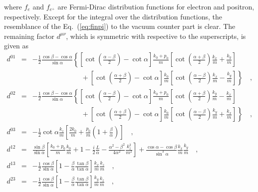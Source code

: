 where $f_{e}$ and $f_{e^{+}}$ are Fermi-Dirac distribution functions for
electron
and positron, respectively.
Except for the integral over the distribution functions, the resemblance of
the
Eq.~(\ref{eq:finpi}) to the vacuum counter part is clear. The remaining
factor
$d^{\mu \nu}$, which is symmetric with respective to the superscripts, is
given as
\begin{eqnarray}
d^{01} & = & -\frac{1}{2} \frac{\cos \beta - \cos \alpha}{\sin \alpha}
\left \{ \left [ \cot \left (\frac{\alpha - \beta}{2} \right ) - \cot \alpha
\right ]
\frac{k_{0} + p_{0}}{m} \left [ \cot \left (\frac{\alpha + \beta}{2}
\right )
\frac{k_{x}}{m} + \frac{k_{y}}{m} \right ]\right . \nonumber \\
&& \qquad \qquad \qquad \quad +  \left . \left [
\cot \left (\frac{\alpha + \beta}{2} \right ) - \cot \alpha \right ]
\frac{k_{0}}{m} \left [\cot \left (
\frac{\alpha - \beta}{2} \right ) \frac{k_{x}}{m} - \frac{k_{y}}{m} \right ]
\right \} \quad , \\
d^{02} & = & -\frac{1}{2} \frac{\cos \beta - \cos \alpha}{\sin \alpha}
\left \{ \left [ \cot \left (\frac{\alpha - \beta}{2} \right ) - \cot \alpha
\right ]
\frac{k_{0} + p_{0}}{m} \left [ \cot \left (\frac{\alpha + \beta}{2}
\right )
\frac{k_{y}}{m} - \frac{k_{x}}{m} \right ]\right . \nonumber \\
&& \qquad \qquad \qquad \quad +  \left . \left [
\cot \left (\frac{\alpha + \beta}{2} \right ) - \cot \alpha \right ]
\frac{k_{0}}{m} \left [\cot \left (
\frac{\alpha - \beta}{2} \right ) \frac{k_{y}}{m} + \frac{k_{x}}{m} \right ]
\right \} \quad , \\
d^{03} & = & - \frac{1}{2} \cot \alpha \frac{k_{z}}{m} \left [
\frac{2k_{0}}{m} + \frac{p_{0}}{m} \left (1 + \frac{\beta}{\alpha} \right )
\right ] \quad , \\
d^{12} & = & \frac{\sin \beta}{\sin \alpha} \left [\frac{k_{0} + p_{0}}{m}
\frac{k_{0}}{m} + 1 - \frac{i}{2} \frac{L}{\alpha} -
\frac{\alpha ^{2} - \beta ^{2}}{4 \alpha ^{2}} \frac{k_{z} ^{2}}{m^{2}}
\right ]
+ \frac{\cos \alpha - \cos \beta }{\sin ^{3} \alpha }
\frac{k_{x}}{m} \frac{k_{y}}{m} \quad , \\
d^{13} & = & - \frac{1}{2} \frac{\cos \beta}{\sin \alpha} \left [
1 - \frac{\beta}{\alpha}\frac{\tan \beta}{\tan \alpha} \right ]
\frac{k_{x}}{m} \frac{k_{z}}{m} \quad , \\
d^{23} & = & - \frac{1}{2} \frac{\cos \beta}{\sin \alpha} \left [
1 - \frac{\beta}{\alpha}\frac{\tan \beta}{\tan \alpha} \right ]
\frac{k_{y}}{m} \frac{k_{z}}{m} \quad , \\

\end{eqnarray}
